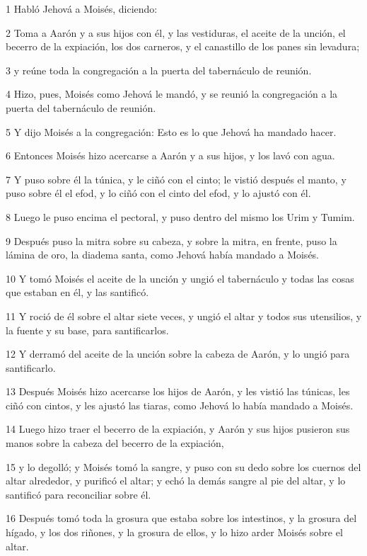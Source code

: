 \par 1 Habló Jehová a Moisés, diciendo:
\par 2 Toma a Aarón y a sus hijos con él, y las vestiduras, el aceite de la unción, el becerro de la expiación, los dos carneros, y el canastillo de los panes sin levadura;
\par 3 y reúne toda la congregación a la puerta del tabernáculo de reunión.
\par 4 Hizo, pues, Moisés como Jehová le mandó, y se reunió la congregación a la puerta del tabernáculo de reunión.
\par 5 Y dijo Moisés a la congregación: Esto es lo que Jehová ha mandado hacer.
\par 6 Entonces Moisés hizo acercarse a Aarón y a sus hijos, y los lavó con agua.
\par 7 Y puso sobre él la túnica, y le ciñó con el cinto; le vistió después el manto, y puso sobre él el efod, y lo ciñó con el cinto del efod, y lo ajustó con él.
\par 8 Luego le puso encima el pectoral, y puso dentro del mismo los Urim y Tumim.
\par 9 Después puso la mitra sobre su cabeza, y sobre la mitra, en frente, puso la lámina de oro, la diadema santa, como Jehová había mandado a Moisés.
\par 10 Y tomó Moisés el aceite de la unción y ungió el tabernáculo y todas las cosas que estaban en él, y las santificó.
\par 11 Y roció de él sobre el altar siete veces, y ungió el altar y todos sus utensilios, y la fuente y su base, para santificarlos.
\par 12 Y derramó del aceite de la unción sobre la cabeza de Aarón, y lo ungió para santificarlo.
\par 13 Después Moisés hizo acercarse los hijos de Aarón, y les vistió las túnicas, les ciñó con cintos, y les ajustó las tiaras, como Jehová lo había mandado a Moisés.
\par 14 Luego hizo traer el becerro de la expiación, y Aarón y sus hijos pusieron sus manos sobre la cabeza del becerro de la expiación,
\par 15 y lo degolló; y Moisés tomó la sangre, y puso con su dedo sobre los cuernos del altar alrededor, y purificó el altar; y echó la demás sangre al pie del altar, y lo santificó para reconciliar sobre él.
\par 16 Después tomó toda la grosura que estaba sobre los intestinos, y la grosura del hígado, y los dos riñones, y la grosura de ellos, y lo hizo arder Moisés sobre el altar.
